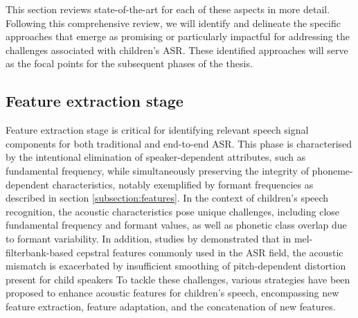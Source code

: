 This section reviews state-of-the-art for each of these aspects in more detail. Following this comprehensive review, we will identify and delineate the specific approaches that emerge as promising or particularly impactful for addressing the challenges associated with children's  ASR. These identified approaches will serve as the focal points for the subsequent phases of the thesis.
\subsection{Feature extraction stage}%
Feature extraction stage is critical for identifying relevant speech signal components for both traditional and end-to-end ASR. This phase is characterised by the intentional elimination of speaker-dependent attributes, such as fundamental frequency, while simultaneously preserving the integrity of phoneme-dependent characteristics, notably exemplified by formant frequencies as described in section \ref{subsection:features}. In the context of children's speech recognition, the acoustic characteristics pose unique challenges, including close fundamental frequency and formant values, as well as phonetic class overlap due to formant variability. In addition, studies by \cite{ghai2009exploring,ghai2011addressing} demonstrated that in mel-filterbank-based cepstral features commonly used in the ASR field, the acoustic mismatch is exacerbated by insufficient smoothing of pitch-dependent distortion present for child speakers To tackle these challenges, various strategies have been proposed to enhance acoustic features for children's speech, encompassing new feature extraction, feature adaptation, and the concatenation of new features.


